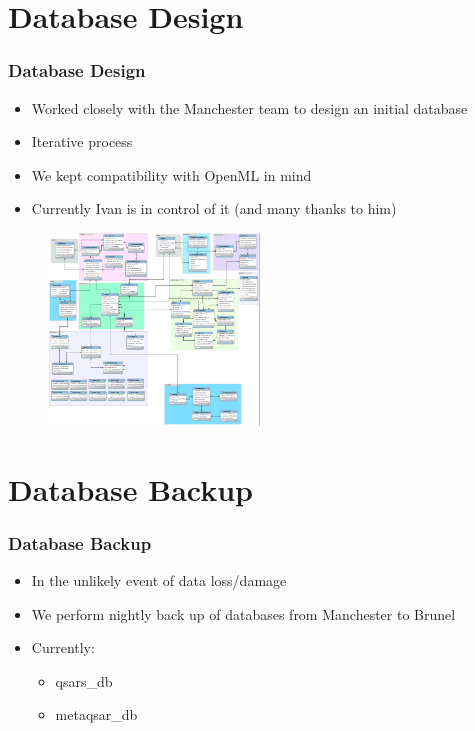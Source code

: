 \documentclass[compress]{beamer}
\begin{document}
\section{Database Design}
\begin{frame}
\frametitle{Database Design} 
\begin{itemize}%
 \item Worked closely with the Manchester team to design an initial database
 \item Iterative process
 \item We kept compatibility with OpenML in mind
 \item Currently Ivan is in control of it (and many thanks to him)
\end{itemize}
\begin{figure}[h!]
  \centering
    \includegraphics[width=0.5\textwidth]{ourdb}
\end{figure}
\end{frame}

\section{Database Backup}
\begin{frame}
\frametitle{Database Backup} 
\begin{itemize}%
 \item In the unlikely event of data loss/damage
 \item We perform nightly back up of databases from Manchester to Brunel
 \item Currently:
    \begin{itemize}%
       \item qsars\_db
       \item metaqsar\_db
    \end{itemize}
\end{itemize}
\end{frame}
\end{document}
